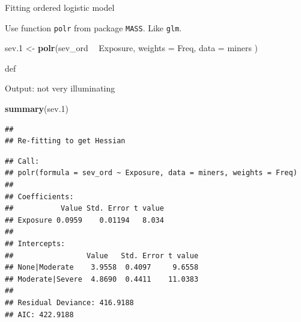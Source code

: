 \documentclass[ignorenonframetext,]{beamer}
\newenvironment{Shaded}{\begin{snugshade}}{\end{snugshade}}
\newcommand{\DataTypeTok}[1]{\textcolor[rgb]{0.13,0.29,0.53}{#1}}
\newcommand{\FloatTok}[1]{\textcolor[rgb]{0.00,0.00,0.81}{#1}}
\newcommand{\KeywordTok}[1]{\textcolor[rgb]{0.13,0.29,0.53}{\textbf{#1}}}
\newcommand{\NormalTok}[1]{#1}
\newcommand{\OperatorTok}[1]{\textcolor[rgb]{0.81,0.36,0.00}{\textbf{#1}}}
\newcommand{\StringTok}[1]{\textcolor[rgb]{0.31,0.60,0.02}{#1}}
\begin{document}
\begin{frame}[fragile]{Fitting ordered logistic model}
\protect\hypertarget{fitting-ordered-logistic-model}{}

Use function \texttt{polr} from package \texttt{MASS}. Like
\texttt{glm}.

\begin{Shaded}
\begin{Highlighting}[]
\NormalTok{sev}\FloatTok{.1}\NormalTok{ <-}\StringTok{ }\KeywordTok{polr}\NormalTok{(sev_ord }\OperatorTok{~}\StringTok{ }\NormalTok{Exposure,}
  \DataTypeTok{weights =}\NormalTok{ Freq,}
  \DataTypeTok{data =}\NormalTok{ miners}
\NormalTok{)}
\end{Highlighting}
\end{Shaded}

def

\end{frame}

\begin{frame}[fragile]{Output: not very illuminating}
\protect\hypertarget{output-not-very-illuminating}{}

\begin{Shaded}
\begin{Highlighting}[]
\KeywordTok{summary}\NormalTok{(sev}\FloatTok{.1}\NormalTok{)}
\end{Highlighting}
\end{Shaded}

\begin{verbatim}
## 
## Re-fitting to get Hessian
\end{verbatim}

\begin{verbatim}
## Call:
## polr(formula = sev_ord ~ Exposure, data = miners, weights = Freq)
## 
## Coefficients:
##           Value Std. Error t value
## Exposure 0.0959    0.01194   8.034
## 
## Intercepts:
##                 Value   Std. Error t value
## None|Moderate    3.9558  0.4097     9.6558
## Moderate|Severe  4.8690  0.4411    11.0383
## 
## Residual Deviance: 416.9188 
## AIC: 422.9188
\end{verbatim}

\end{frame}
\end{document}
